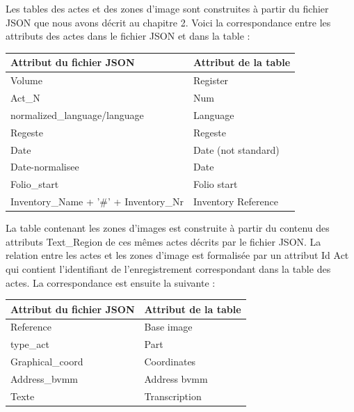 \documentclass[a4paper,12pt,twoside]{book}
\begin{document}
	\noindent Les tables des actes et des zones d'image sont construites à partir du fichier JSON que nous avons décrit au chapitre 2. Voici la correspondance entre les attributs des actes dans le fichier JSON et dans la table :
	
	\begin{center}
		\begin{tabular}{|p{8cm}|p{8cm}|}
			\hline
			Attribut du fichier JSON & Attribut de la table \\ \hline \hline
			Volume & Register \\ \hline
			Act\_N & Num \\ \hline
			normalized\_language/language & Language \\ \hline
			Regeste & Regeste \\ \hline
			Date & Date (not standard) \\ \hline
			Date-normalisee & Date \\ \hline
			Folio\_start & Folio start \\ \hline
			Inventory\_Name + '\#' + Inventory\_Nr & Inventory Reference \\ \hline
		\end{tabular}
	\end{center}
	
	\noindent La table contenant les zones d'images est construite à partir du contenu des attributs \og Text\_Region \fg{} de ces mêmes actes décrits par le fichier JSON. La relation entre les actes et les zones d'image est formalisée par un attribut \og Id Act \fg{} qui contient l'identifiant de l'enregistrement correspondant dans la table des actes. La correspondance est ensuite la suivante :
	
	\begin{center}
		\begin{tabular}{|p{5cm}|p{5cm}|}
			\hline
			Attribut du fichier JSON & Attribut de la table \\ \hline \hline
			Reference & Base image \\ \hline
			type\_act  & Part \\ \hline
			Graphical\_coord & Coordinates \\ \hline
			Address\_bvmm & Address bvmm \\ \hline
			Texte & Transcription \\ \hline
		\end{tabular}
	\end{center}
\end{document}
